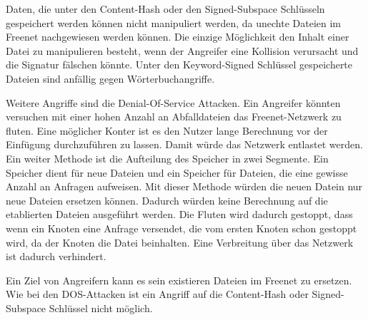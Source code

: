 Daten, die unter den Content-Hash oder den Signed-Subspace Schlüsseln
gespeichert werden können nicht manipuliert werden, da unechte Dateien im
Freenet nachgewiesen werden können. Die einzige Möglichkeit den Inhalt einer
Datei zu manipulieren besteht, wenn der Angreifer eine Kollision verursacht und
die Signatur fälschen könnte. Unter den Keyword-Signed Schlüssel gespeicherte
Dateien sind anfällig gegen Wörterbuchangriffe.

Weitere Angriffe sind die Denial-Of-Service Attacken. Ein Angreifer könnten
versuchen mit einer hohen Anzahl an Abfalldateien das Freenet-Netzwerk zu
fluten. Eine möglicher Konter ist es den Nutzer lange Berechnung vor der
Einfügung durchzuführen zu lassen. Damit würde das Netzwerk entlastet werden.
Ein weiter Methode ist die Aufteilung des Speicher in zwei Segmente.
Ein Speicher dient für neue Dateien und ein Speicher für Dateien, die eine
gewisse Anzahl an Anfragen aufweisen. Mit dieser Methode würden die neuen Datein
nur neue Dateien ersetzen können. Dadurch würden keine Berechnung auf die
etablierten Dateien ausgeführt werden. Die Fluten wird dadurch gestoppt, dass
wenn ein Knoten eine Anfrage versendet, die vom ersten Knoten schon gestoppt
wird, da der Knoten die Datei beinhalten. Eine Verbreitung über das Netzwerk
ist dadurch verhindert.

Ein Ziel von Angreifern kann es sein existieren Dateien im Freenet zu ersetzen.
Wie bei den DOS-Attacken ist ein Angriff auf die Content-Hash oder
Signed-Subspace Schlüssel nicht möglich.
